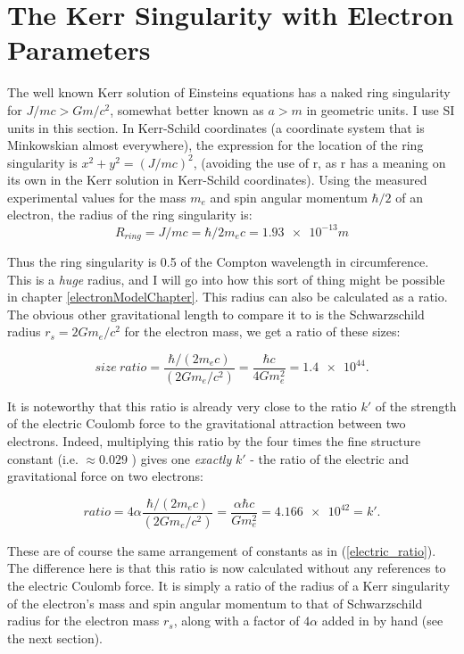 \documentclass[../rzero]{subfiles}
\begin{document}
\section{The Kerr Singularity with Electron Parameters}\label{sectionKerrRingEM}
The well known Kerr solution of Einsteins equations has a naked ring singularity for $J/mc > Gm/c^2$, somewhat better known as $a > m$ in geometric units. I use SI units in this section. In Kerr-Schild coordinates (a coordinate system that is Minkowskian almost everywhere)\cite{Visser2008}, the expression for the location of the ring singularity is $x^2 + y^2 = (J/mc)^2$, (avoiding the use of r, as r has a meaning on its own in the Kerr solution in Kerr-Schild coordinates). Using the measured experimental values for the mass $m_e$ and spin angular momentum $\hbar/2$ of an electron, the radius of the ring singularity is:
\begin{equation} \label{radius_eqn}
	R_{ring} = J/mc = \hbar/2m_ec = \num{1.93e-13}m
\end{equation}

Thus the ring singularity is 0.5 of the Compton wavelength in circumference. This is a \textit{huge} radius, and I will go into how this sort of thing might be possible in chapter \ref{electronModelChapter}. This radius can also be calculated as a ratio. The obvious other gravitational length to compare it to is the Schwarzschild radius $r_s = 2Gm_e/c^2$ for the electron mass, we get a ratio of these sizes:

\begin{equation}
	size \ ratio = \frac{\hbar/(2m_ec)}{(2Gm_e/c^2)} = \frac{\hbar c}{4G m_e^2} = \num{1.4e44}.
\end{equation}

 It is noteworthy that this ratio is already very close to the ratio $k'$ of the strength of the electric Coulomb force to the gravitational attraction between two electrons. Indeed, multiplying this ratio by the four times the fine structure constant (i.e. $\approx 0.029 $ ) gives one \textit{exactly} $k'$ - the ratio of the electric and gravitational force on two electrons:
 
\begin{equation}
	ratio = 4\alpha \frac{\hbar/(2m_ec)}{(2Gm_e/c^2)} = \frac{\alpha \hbar c}{G m_e^2} = \num{4.166e42} = k'.
\end{equation}


These are of course the same arrangement of constants as in (\ref{electric_ratio}). The difference here is that this ratio is now calculated without any references to the electric Coulomb force. It is simply a ratio of the radius of a Kerr singularity of the electron's mass and spin angular momentum to that of Schwarzschild radius for the electron mass $r_s$, along with a factor of $4\alpha$ added in by hand (see the next section). 
\end{document}
